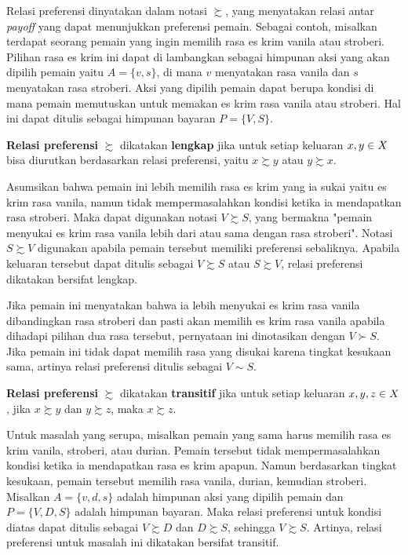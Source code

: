 Relasi preferensi dinyatakan dalam notasi $\succsim$, yang menyatakan relasi antar \textit{payoff} yang dapat menunjukkan preferensi pemain. Sebagai contoh, misalkan terdapat seorang pemain yang ingin memilih rasa es krim vanila atau stroberi. Pilihan rasa es krim ini dapat di lambangkan sebagai himpunan aksi yang akan dipilih pemain yaitu  $A = \lbrace v, s\rbrace$, di mana $v$ menyatakan rasa vanila dan $s$ menyatakan rasa stroberi. Aksi yang dipilih pemain dapat berupa kondisi di mana pemain memutuskan untuk memakan es krim rasa vanila atau stroberi. Hal ini dapat ditulis sebagai himpunan bayaran $P = \lbrace V, S\rbrace$.

\begin{aksioma}
    \textbf{Relasi preferensi} $\succsim$ dikatakan \textbf{lengkap} jika untuk setiap keluaran $x,\space y \in X$ bisa diurutkan berdasarkan relasi preferensi, yaitu $x \succsim y$ atau $y \succsim x$.
\end{aksioma}

Asumsikan bahwa pemain ini lebih memilih rasa es krim yang ia sukai yaitu es krim rasa vanila, namun tidak mempermasalahkan kondisi ketika ia mendapatkan rasa stroberi. Maka dapat digunakan notasi $V \succsim S$, yang bermakna "pemain menyukai es krim rasa vanila lebih dari atau sama dengan rasa stroberi". Notasi $S \succsim V$ digunakan apabila pemain tersebut memiliki preferensi sebaliknya.
Apabila keluaran tersebut dapat ditulis sebagai $V \succsim S$ atau $S \succsim V$, relasi preferensi dikatakan bersifat lengkap.

Jika pemain ini menyatakan bahwa ia lebih menyukai es krim rasa vanila dibandingkan rasa stroberi dan pasti akan memilih es krim rasa vanila apabila dihadapi pilihan dua rasa tersebut, pernyataan ini dinotasikan dengan $V \succ S$. Jika pemain ini tidak dapat memilih rasa yang disukai karena tingkat kesukaan sama, artinya relasi preferensi ditulis sebagai $V \sim S$.

\begin{aksioma}
    \textbf{Relasi preferensi} $\succsim$ dikatakan \textbf{transitif} jika untuk setiap keluaran $x,\space y, \space z \in X$, jika $x \succsim y$ dan $y \succsim z$, maka $x \succsim z$.
\end{aksioma}

Untuk masalah yang serupa, misalkan pemain yang sama harus memilih rasa es krim vanila, stroberi, atau durian. Pemain tersebut tidak mempermasalahkan kondisi ketika ia mendapatkan rasa es krim apapun.
Namun berdasarkan tingkat kesukaan, pemain tersebut memilih rasa vanila, durian, kemudian stroberi. Misalkan $A = \lbrace v, d, s\rbrace$ adalah himpunan aksi yang dipilih pemain  dan $P = \lbrace V, D, S\rbrace$ adalah himpunan bayaran. Maka relasi preferensi untuk kondisi diatas dapat ditulis sebagai $V \succsim D$ dan $D \succsim S$, sehingga $V \succsim S$. Artinya, relasi preferensi untuk masalah ini dikatakan bersifat transitif.

